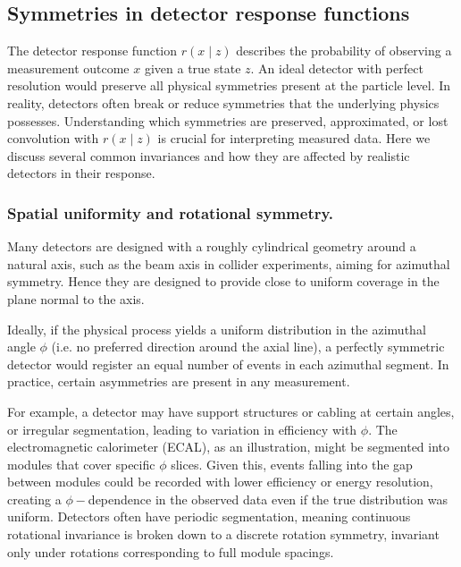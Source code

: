     \subsection{Symmetries in detector response functions}
    \label{subsec:detector-symmetries}
        The detector response function $r(x\mid z)$ describes the probability of observing a measurement outcome $x$ given a true state $z$.
        An ideal detector with perfect resolution would preserve all physical symmetries present at the particle level.
        In reality, detectors often break or reduce symmetries that the underlying physics possesses.
        Understanding which symmetries are preserved, approximated, or lost convolution with $r(x\mid z)$ is crucial for interpreting measured data.
        Here we discuss several common invariances and how they are affected by realistic detectors in their response.

        \subsubsection{Spatial uniformity and rotational symmetry.}
            Many detectors are designed with a roughly cylindrical geometry around a natural axis, such as the beam axis in collider experiments, aiming for azimuthal symmetry.
            Hence they are designed to provide close to uniform coverage in the plane normal to the axis.
            
            Ideally, if the physical process yields a uniform distribution in the azimuthal angle $\phi$ (i.e. no preferred direction around the axial line), a perfectly symmetric detector would register an equal number of events in each azimuthal segment.
            In practice, certain asymmetries are present in any measurement.
            
            For example, a detector may have support structures or cabling at certain angles, or irregular segmentation, leading to variation in efficiency with $\phi$.
            The electromagnetic calorimeter (ECAL), as an illustration, might be segmented into modules that cover specific $\phi$ slices.
            Given this, events falling into the gap between modules could be recorded with lower efficiency or energy resolution, creating a $\phi-$dependence in the observed data even if the true distribution was uniform.
            Detectors often have periodic segmentation, meaning continuous rotational invariance is broken down to a discrete rotation symmetry, invariant only under rotations corresponding to full module spacings.
            
